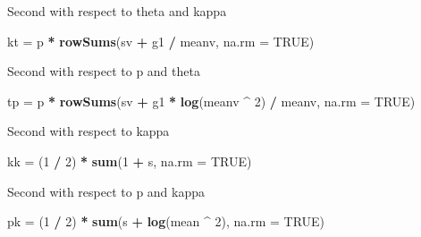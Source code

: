 \documentclass[]{article}
\newenvironment{Shaded}{\begin{snugshade}}{\end{snugshade}}
\newcommand{\DataTypeTok}[1]{\textcolor[rgb]{0.13,0.29,0.53}{#1}}
\newcommand{\DecValTok}[1]{\textcolor[rgb]{0.00,0.00,0.81}{#1}}
\newcommand{\KeywordTok}[1]{\textcolor[rgb]{0.13,0.29,0.53}{\textbf{#1}}}
\newcommand{\NormalTok}[1]{#1}
\newcommand{\OperatorTok}[1]{\textcolor[rgb]{0.81,0.36,0.00}{\textbf{#1}}}
\newcommand{\OtherTok}[1]{\textcolor[rgb]{0.56,0.35,0.01}{#1}}
\newcommand{\StringTok}[1]{\textcolor[rgb]{0.31,0.60,0.02}{#1}}
\begin{document}
Second with respect to theta and kappa

\begin{Shaded}
\begin{Highlighting}[]
\NormalTok{kt =}\StringTok{ }\NormalTok{p }\OperatorTok{*}\StringTok{ }\KeywordTok{rowSums}\NormalTok{(sv }\OperatorTok{+}\StringTok{ }\NormalTok{g1 }\OperatorTok{/}\StringTok{ }\NormalTok{meanv, }\DataTypeTok{na.rm =} \OtherTok{TRUE}\NormalTok{)}
\end{Highlighting}
\end{Shaded}

Second with respect to p and theta

\begin{Shaded}
\begin{Highlighting}[]
\NormalTok{tp =}\StringTok{ }\NormalTok{p }\OperatorTok{*}\StringTok{ }\KeywordTok{rowSums}\NormalTok{(sv }\OperatorTok{+}\StringTok{ }\NormalTok{g1 }\OperatorTok{*}\StringTok{ }\KeywordTok{log}\NormalTok{(meanv }\OperatorTok{^}\StringTok{ }\DecValTok{2}\NormalTok{) }\OperatorTok{/}\StringTok{ }\NormalTok{meanv, }\DataTypeTok{na.rm =} \OtherTok{TRUE}\NormalTok{)}
\end{Highlighting}
\end{Shaded}

Second with respect to kappa

\begin{Shaded}
\begin{Highlighting}[]
\NormalTok{kk =}\StringTok{ }\NormalTok{(}\DecValTok{1} \OperatorTok{/}\StringTok{ }\DecValTok{2}\NormalTok{) }\OperatorTok{*}\StringTok{ }\KeywordTok{sum}\NormalTok{(}\DecValTok{1} \OperatorTok{+}\StringTok{ }\NormalTok{s, }\DataTypeTok{na.rm =} \OtherTok{TRUE}\NormalTok{)}
\end{Highlighting}
\end{Shaded}

Second with respect to p and kappa

\begin{Shaded}
\begin{Highlighting}[]
\NormalTok{pk =}\StringTok{ }\NormalTok{(}\DecValTok{1} \OperatorTok{/}\StringTok{ }\DecValTok{2}\NormalTok{) }\OperatorTok{*}\StringTok{ }\KeywordTok{sum}\NormalTok{(s }\OperatorTok{+}\StringTok{ }\KeywordTok{log}\NormalTok{(mean }\OperatorTok{^}\StringTok{ }\DecValTok{2}\NormalTok{), }\DataTypeTok{na.rm =} \OtherTok{TRUE}\NormalTok{)}
\end{Highlighting}
\end{Shaded}
\end{document}
